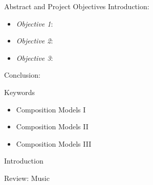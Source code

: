 

\setlength{\belowcaptionskip}{2ex}
\setlength\belowdisplayshortskip{2ex}
\begin{frame}[t]
\begin{columns}[t]
\begin{column}{\onecolwid} %
\begin{alertblock}{Abstract and Project Objectives}
Introduction:
\begin{itemize}
\item \textit{Objective 1}: 
\item \textit{Objective 2}: 
\item \textit{Objective 3}: 
\end{itemize}
Conclusion:
\end{alertblock}
\begin{block}{Keywords}
\begin{itemize}
\item Composition Models I
\item Composition Models II
\item Composition Models III
\end{itemize}	
\end{block}
\begin{alertblock}{Introduction}
\end{alertblock}
\begin{alertblock}{Review: Music}


\end{alertblock}
\end{column}
\end{columns}
\end{frame}
